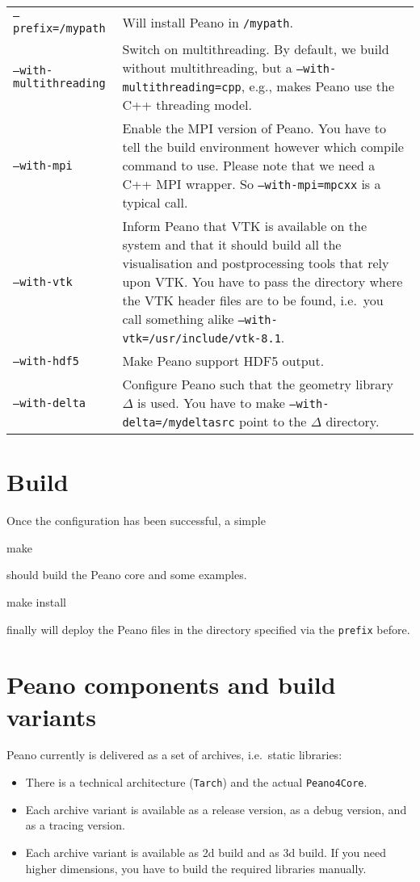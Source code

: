 \begin{center}
 \begin{tabular}{lp{10cm}}
  \texttt{--prefix=/mypath} & Will install Peano in \texttt{/mypath}.
   \\
  \texttt{--with-multithreading} & Switch on multithreading. By default, we
  build without multithreading, but a \texttt{--with-multithreading=cpp}, e.g.,
  makes Peano use the C++ threading model. 
   \\
  \texttt{--with-mpi} & Enable the MPI version of Peano. You have to tell the
  build environment however which compile command to use. Please note that
  we need a C++ MPI wrapper. So \texttt{--with-mpi=mpcxx} is a typical call. 
   \\
  \texttt{--with-vtk} & Inform Peano that VTK is available on the system and
  that it should build all the visualisation and postprocessing tools that rely
  upon VTK. You have to pass the directory where the VTK header files are to be
  found, i.e.~you call something alike \texttt{--with-vtk=/usr/include/vtk-8.1}.
   \\
  \texttt{--with-hdf5} & Make Peano support HDF5 output. 
   \\
  \texttt{--with-delta} & Configure Peano such that the geometry library
  $\Delta $ is used. You have to make \texttt{--with-delta=/mydeltasrc} point
  to the $\Delta $ directory.
 \end{tabular}
\end{center}


\section{Build}

Once the configuration has been successful, a simple 
\begin{code}
make
\end{code}
should build the Peano core and some examples.


\begin{code}
make install
\end{code}
finally will deploy the Peano files in the directory specified via the
\texttt{prefix} before.


\section{Peano components and build variants}

Peano currently is delivered as a set of archives, i.e.~static libraries:
\begin{itemize}
  \item There is a technical architecture (\texttt{Tarch}) and the actual
  \texttt{Peano4Core}.
  \item Each archive variant is available as a release version, as a debug
  version, and as a tracing version. 
  \item Each archive variant is available as 2d build and as 3d build. If you
  need higher dimensions, you have to build the required libraries manually.
\end{itemize}


